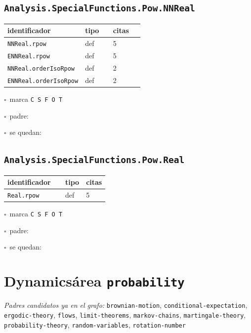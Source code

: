 \documentclass[10pt,a4paper]{article}
\begin{document}
\subsection*{\texttt{Analysis.SpecialFunctions.Pow.NNReal}}
\noindent\begin{minipage}{0.56\linewidth}\small\begin{tabular}{@{}>{\raggedright\arraybackslash}p{0.58\linewidth}ll@{}}\toprule
identificador & tipo & citas\\\midrule
\texttt{NNReal.\allowbreak{}rpow} & def & 5\\
\texttt{ENNReal.\allowbreak{}rpow} & def & 5\\
\texttt{NNReal.\allowbreak{}orderIsoRpow} & def & 2\\
\texttt{ENNReal.\allowbreak{}orderIsoRpow} & def & 2\\
\bottomrule\end{tabular}\end{minipage}\hfill\begin{minipage}{0.40\linewidth}\small$\square$~marca \texttt{C S F O T}\par\smallskip$\square$~padre: \dotfill\par\smallskip$\square$~se quedan: \dotfill\par\end{minipage}\par\medskip
\subsection*{\texttt{Analysis.SpecialFunctions.Pow.Real}}
\noindent\begin{minipage}{0.56\linewidth}\small\begin{tabular}{@{}>{\raggedright\arraybackslash}p{0.58\linewidth}ll@{}}\toprule
identificador & tipo & citas\\\midrule
\texttt{Real.\allowbreak{}rpow} & def & 5\\
\bottomrule\end{tabular}\end{minipage}\hfill\begin{minipage}{0.40\linewidth}\small$\square$~marca \texttt{C S F O T}\par\smallskip$\square$~padre: \dotfill\par\smallskip$\square$~se quedan: \dotfill\par\end{minipage}\par\medskip
\section{Dynamics\hfill{\normalsize\normalfont área \texttt{probability}}}
\begin{sloppypar}\noindent\small\textit{Padres candidatos ya en el grafo:} \texttt{brownian-motion}, \texttt{conditional-expectation}, \texttt{ergodic-theory}, \texttt{flows}, \texttt{limit-theorems}, \texttt{markov-chains}, \texttt{martingale-theory}, \texttt{probability-theory}, \texttt{random-variables}, \texttt{rotation-number}\end{sloppypar}
\end{document}
